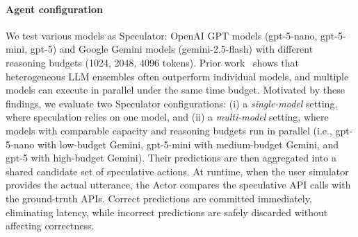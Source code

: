
\paragraph{Agent configuration} We test various models as Speculator: OpenAI GPT models (gpt-5-nano, gpt-5-mini, gpt-5) and Google Gemini models (gemini-2.5-flash) with different reasoning budgets (1024, 2048, 4096 tokens).
Prior work~\cite{jiang-etal-2023-llm, chen_LLMEnsemble_2025} shows that heterogeneous LLM ensembles often outperform individual models, and multiple models can execute in parallel under the same time budget. Motivated by these findings, we evaluate two Speculator configurations: (i) a \emph{single-model} setting, where speculation relies on one model, and (ii) a \emph{multi-model} setting, where models with comparable capacity and reasoning budgets run in parallel (i.e., gpt-5-nano with low-budget Gemini, gpt-5-mini with medium-budget Gemini, and gpt-5 with high-budget Gemini). Their predictions are then aggregated into a shared candidate set of speculative actions. At runtime, when the user simulator provides the actual utterance, the Actor compares the speculative API calls with the ground-truth APIs. Correct predictions are committed immediately, eliminating latency, while incorrect predictions are safely discarded without affecting correctness.


